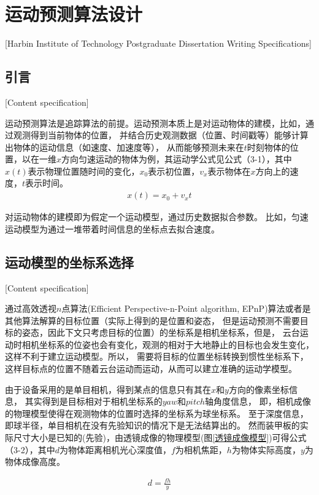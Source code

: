 


\chapter[运动预测算法设计]{运动预测算法设计}[Harbin Institute of Technology Postgraduate Dissertation Writing Specifications]


\section{引言}[Content specification]

运动预测算法是追踪算法的前提。运动预测本质上是对运动物体的建模，比如，通过观测得到当前物体的位置，
并结合历史观测数据（位置、时间戳等）能够计算出物体的运动信息（如速度、加速度等），
从而能够预测未来在$t$时刻物体的位置，以在一维$x$方向匀速运动的物体为例，其运动学公式见公式（3-1），其中$x(t)$表示物理位置随时间的变化，$x_0$表示初位置，$v_x$表示物体在$x$方向上的速度，$t$表示时间。
\begin{gather}
    x(t) = x_0 + v_xt \label{linear_model}
\end{gather}

对运动物体的建模即为假定一个运动模型，通过历史数据拟合参数。
比如，匀速运动模型为通过一堆带着时间信息的坐标点去拟合速度。




\section{运动模型的坐标系选择}[Content specification]

通过高效透视$n$点算法(Efficient Perspective-n-Point algorithm, EPnP)算法或者是其他算法解算的目标位置（实际上得到的是位置和姿态，
但是运动预测不需要目标的姿态，因此下文只考虑目标的位置）的坐标系是相机坐标系，但是，
云台运动时相机坐标系的位姿也会有变化，观测的相对于大地静止的目标也会发生变化，这样不利于建立运动模型。所以，
需要将目标的位置坐标转换到惯性坐标系下，这样目标点的位置不随着云台运动而运动，从而可以建立准确的运动学模型。\par
由于设备采用的是单目相机，得到某点的信息只有其在$x$和$y$方向的像素坐标信息，
其实得到是目标相对于相机坐标系的$yaw$和$pitch$轴角度信息，
即，相机成像的物理模型使得在观测物体的位置时选择的坐标系为球坐标系。
至于深度信息，即球半径，单目相机在没有先验知识的情况下是无法结算出的。
然而装甲板的实际尺寸大小是已知的(先验)，由透镜成像的物理模型(图\ref{透镜成像模型})可得公式（3-2），其中$d$为物体距离相机光心深度值，$f$为相机焦距，$h$为物体实际高度，$y$为物体成像高度。\par
\begin{gather}
    d = \frac{fh}{y} 
\end{gather}

